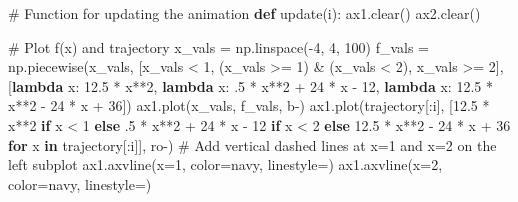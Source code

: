 \documentclass[
  russian,
  letterpaper,
  DIV=11,
  numbers=noendperiod]{scrartcl}
\newenvironment{Shaded}{\begin{snugshade}}{\end{snugshade}}
\newcommand{\CommentTok}[1]{\textcolor[rgb]{0.37,0.37,0.37}{#1}}
\newcommand{\ControlFlowTok}[1]{\textcolor[rgb]{0.00,0.23,0.31}{\textbf{#1}}}
\newcommand{\DecValTok}[1]{\textcolor[rgb]{0.68,0.00,0.00}{#1}}
\newcommand{\FloatTok}[1]{\textcolor[rgb]{0.68,0.00,0.00}{#1}}
\newcommand{\KeywordTok}[1]{\textcolor[rgb]{0.00,0.23,0.31}{\textbf{#1}}}
\newcommand{\NormalTok}[1]{\textcolor[rgb]{0.00,0.23,0.31}{#1}}
\newcommand{\OperatorTok}[1]{\textcolor[rgb]{0.37,0.37,0.37}{#1}}
\newcommand{\StringTok}[1]{\textcolor[rgb]{0.13,0.47,0.30}{#1}}
\begin{document}
\begin{enumerate}
\begin{enumerate}
\begin{Shaded}
\begin{Highlighting}[]
\CommentTok{\# Function for updating the animation}
\KeywordTok{def}\NormalTok{ update(i):}
\NormalTok{    ax1.clear()}
\NormalTok{    ax2.clear()}

    \CommentTok{\# Plot f(x) and trajectory}
\NormalTok{    x\_vals }\OperatorTok{=}\NormalTok{ np.linspace(}\OperatorTok{{-}}\DecValTok{4}\NormalTok{, }\DecValTok{4}\NormalTok{, }\DecValTok{100}\NormalTok{)}
\NormalTok{    f\_vals }\OperatorTok{=}\NormalTok{ np.piecewise(x\_vals, [x\_vals }\OperatorTok{\textless{}} \DecValTok{1}\NormalTok{, (x\_vals }\OperatorTok{\textgreater{}=} \DecValTok{1}\NormalTok{) }\OperatorTok{\&}\NormalTok{ (x\_vals }\OperatorTok{\textless{}} \DecValTok{2}\NormalTok{), x\_vals }\OperatorTok{\textgreater{}=} \DecValTok{2}\NormalTok{],}
\NormalTok{                        [}\KeywordTok{lambda}\NormalTok{ x: }\FloatTok{12.5} \OperatorTok{*}\NormalTok{ x}\OperatorTok{**}\DecValTok{2}\NormalTok{, }\KeywordTok{lambda}\NormalTok{ x: }\FloatTok{.5} \OperatorTok{*}\NormalTok{ x}\OperatorTok{**}\DecValTok{2} \OperatorTok{+} \DecValTok{24} \OperatorTok{*}\NormalTok{ x }\OperatorTok{{-}} \DecValTok{12}\NormalTok{, }\KeywordTok{lambda}\NormalTok{ x: }\FloatTok{12.5} \OperatorTok{*}\NormalTok{ x}\OperatorTok{**}\DecValTok{2} \OperatorTok{{-}} \DecValTok{24} \OperatorTok{*}\NormalTok{ x }\OperatorTok{+} \DecValTok{36}\NormalTok{])}
\NormalTok{    ax1.plot(x\_vals, f\_vals, }\StringTok{\textquotesingle{}b{-}\textquotesingle{}}\NormalTok{)}
\NormalTok{    ax1.plot(trajectory[:i], [}\FloatTok{12.5} \OperatorTok{*}\NormalTok{ x}\OperatorTok{**}\DecValTok{2} \ControlFlowTok{if}\NormalTok{ x }\OperatorTok{\textless{}} \DecValTok{1} \ControlFlowTok{else} \FloatTok{.5} \OperatorTok{*}\NormalTok{ x}\OperatorTok{**}\DecValTok{2} \OperatorTok{+} \DecValTok{24} \OperatorTok{*}\NormalTok{ x }\OperatorTok{{-}} \DecValTok{12} \ControlFlowTok{if}\NormalTok{ x }\OperatorTok{\textless{}} \DecValTok{2} \ControlFlowTok{else} \FloatTok{12.5} \OperatorTok{*}\NormalTok{ x}\OperatorTok{**}\DecValTok{2} \OperatorTok{{-}} \DecValTok{24} \OperatorTok{*}\NormalTok{ x }\OperatorTok{+} \DecValTok{36} \ControlFlowTok{for}\NormalTok{ x }\KeywordTok{in}\NormalTok{ trajectory[:i]], }\StringTok{\textquotesingle{}ro{-}\textquotesingle{}}\NormalTok{)}
    \CommentTok{\# Add vertical dashed lines at x=1 and x=2 on the left subplot}
\NormalTok{    ax1.axvline(x}\OperatorTok{=}\DecValTok{1}\NormalTok{, color}\OperatorTok{=}\StringTok{\textquotesingle{}navy\textquotesingle{}}\NormalTok{, linestyle}\OperatorTok{=}\StringTok{\textquotesingle{}{-}{-}\textquotesingle{}}\NormalTok{)}
\NormalTok{    ax1.axvline(x}\OperatorTok{=}\DecValTok{2}\NormalTok{, color}\OperatorTok{=}\StringTok{\textquotesingle{}navy\textquotesingle{}}\NormalTok{, linestyle}\OperatorTok{=}\StringTok{\textquotesingle{}{-}{-}\textquotesingle{}}\NormalTok{)}


\end{Highlighting}
\end{Shaded}
\end{enumerate}
\end{enumerate}
\end{document}
